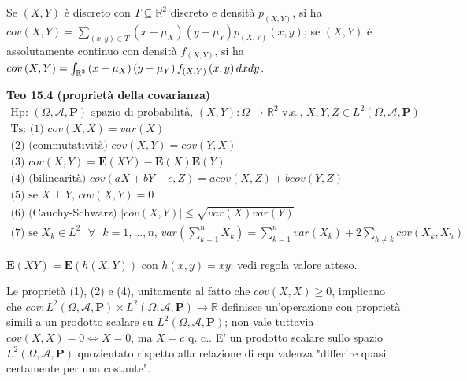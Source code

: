 \documentclass{article}
\begin{document}
Se $\left( X,Y\right) $ \`{e} discreto con $T\subseteq 
\mathbb{R}
^{2}$ discreto e densit\`{a} $p_{\left( X,Y\right) }$, si ha $cov\left(
X,Y\right) =\sum_{\left( x,y\right) \in T}\left( x-\mu _{X}\right) \left(
y-\mu _{Y}\right) p_{\left( X,Y\right) }\left( x,y\right) $; se $\left(
X,Y\right) $ \`{e} assolutamente continuo con densit\`{a} $f_{\left(
X,Y\right) }$, si ha $cov\left( X,Y\right) =\int_{%
\mathbb{R}
^{2}}\left( x-\mu _{X}\right) \left( y-\mu _{Y}\right) f_{\left( X,Y\right)
}\left( x,y\right) dxdy$.

\textbf{Teo 15.4 (propriet\`{a} della covarianza)}%
\begin{gather*}
\text{Hp: }\left( \Omega ,\mathcal{A},\mathbf{P}\right) \text{ spazio di
probabilit\`{a}, }\left( X,Y\right) :\Omega \rightarrow 
\mathbb{R}
^{2}\text{ v.a., }X,Y,Z\in L^{2}\left( \Omega ,\mathcal{A},\mathbf{P}\right)
\\
\text{Ts: (1) }cov\left( X,X\right) =var\left( X\right) \\
\text{(2) (commutativit\`{a}) }cov\left( X,Y\right) =cov\left( Y,X\right) \\
\text{(3) }cov\left( X,Y\right) =\mathbf{E}\left( XY\right) -\mathbf{E}%
\left( X\right) \mathbf{E}\left( Y\right) \\
\text{(4) (bilinearit\`{a}) }cov\left( aX+bY+c,Z\right) =acov\left(
X,Z\right) +bcov\left( Y,Z\right) \\
\text{(5) se }X\perp Y\text{, }cov\left( X,Y\right) =0 \\
\text{(6) (Cauchy-Schwarz) }\left\vert cov\left( X,Y\right) \right\vert \leq 
\sqrt{var\left( X\right) var\left( Y\right) } \\
\text{(7) se }X_{k}\in L^{2}\text{ }\forall \text{ }k=1,...,n\text{, }%
var\left( \sum_{k=1}^{n}X_{k}\right) =\sum_{k=1}^{n}var\left( X_{k}\right)
+2\sum_{h\neq k}cov\left( X_{k},X_{h}\right)
\end{gather*}

$\mathbf{E}\left( XY\right) =\mathbf{E}\left( h\left( X,Y\right) \right) $
con $h\left( x,y\right) =xy$: vedi regola valore atteso.

Le propriet\`{a} (1), (2) e (4), unitamente al fatto che $cov\left(
X,X\right) \geq 0$, implicano che $cov:L^{2}\left( \Omega ,\mathcal{A},%
\mathbf{P}\right) \times L^{2}\left( \Omega ,\mathcal{A},\mathbf{P}\right)
\rightarrow 
\mathbb{R}
$ definisce un'operazione con propriet\`{a} simili a un prodotto scalare su $%
L^{2}\left( \Omega ,\mathcal{A},\mathbf{P}\right) $; non vale tuttavia $%
cov\left( X,X\right) =0\Longleftrightarrow X=0$, ma $X=c$ q. c.. E' un
prodotto scalare sullo spazio $L^{2}\left( \Omega ,\mathcal{A},\mathbf{P}%
\right) $ quozientato rispetto alla relazione di equivalenza "differire
quasi certamente per una costante".
\end{document}
